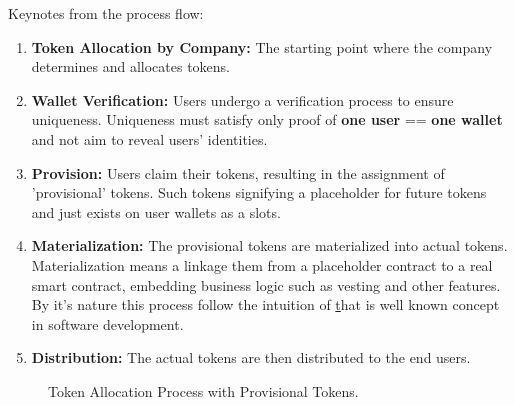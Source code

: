 \documentclass[12pt,oneside]{article}
\begin{document}
Keynotes from the process flow:
\begin{enumerate}
  \item \textbf{Token Allocation by Company:} The starting point where the company determines and allocates tokens.
  \item \textbf{Wallet Verification:} Users undergo a verification process to ensure uniqueness. 
  Uniqueness must satisfy only proof of \textbf{one user} == \textbf{one wallet} and not aim to reveal users' identities. 
  \item \textbf{Provision:} Users claim their tokens, resulting in the assignment of 'provisional' tokens. Such tokens signifying a placeholder for future tokens and just exists on user wallets as a slots.
  \item \textbf{Materialization:} The provisional tokens are materialized into actual tokens. Materialization means a linkage them from a placeholder contract 
  to a real smart contract, embedding business logic such as vesting and other features. 
  By it's nature this process follow the intuition of \href{https://en.wikipedia.org/wiki/Late_binding} that is well known concept in software development. 
  \item \textbf{Distribution:} The actual tokens are then distributed to the end users.
\end{enumerate}

\begin{figure}[H]
  \centering
  \caption{Token Allocation Process with Provisional Tokens.}
  \label{fig:token_allocation_prov}
\end{figure}
\end{document}
